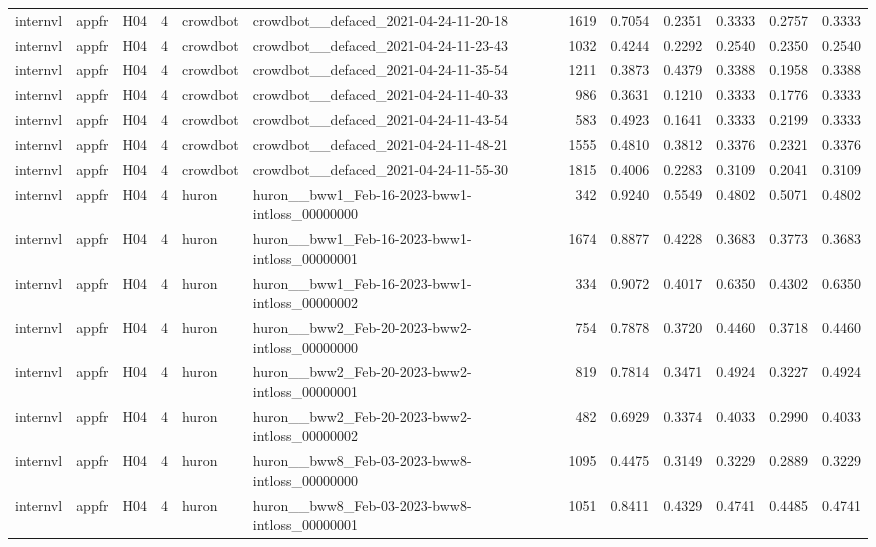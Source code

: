 \begin{table}[tbp]
\begin{tabular}{lllrllrrrrrr}
internvl & appfr & H04 & 4 & crowdbot & crowdbot\_\_defaced\_2021-04-24-11-20-18 & 1619 & 0.7054 & 0.2351 & 0.3333 & 0.2757 & 0.3333 \\
internvl & appfr & H04 & 4 & crowdbot & crowdbot\_\_defaced\_2021-04-24-11-23-43 & 1032 & 0.4244 & 0.2292 & 0.2540 & 0.2350 & 0.2540 \\
internvl & appfr & H04 & 4 & crowdbot & crowdbot\_\_defaced\_2021-04-24-11-35-54 & 1211 & 0.3873 & 0.4379 & 0.3388 & 0.1958 & 0.3388 \\
internvl & appfr & H04 & 4 & crowdbot & crowdbot\_\_defaced\_2021-04-24-11-40-33 & 986 & 0.3631 & 0.1210 & 0.3333 & 0.1776 & 0.3333 \\
internvl & appfr & H04 & 4 & crowdbot & crowdbot\_\_defaced\_2021-04-24-11-43-54 & 583 & 0.4923 & 0.1641 & 0.3333 & 0.2199 & 0.3333 \\
internvl & appfr & H04 & 4 & crowdbot & crowdbot\_\_defaced\_2021-04-24-11-48-21 & 1555 & 0.4810 & 0.3812 & 0.3376 & 0.2321 & 0.3376 \\
internvl & appfr & H04 & 4 & crowdbot & crowdbot\_\_defaced\_2021-04-24-11-55-30 & 1815 & 0.4006 & 0.2283 & 0.3109 & 0.2041 & 0.3109 \\
internvl & appfr & H04 & 4 & huron & huron\_\_bww1\_Feb-16-2023-bww1-intloss\_00000000 & 342 & 0.9240 & 0.5549 & 0.4802 & 0.5071 & 0.4802 \\
internvl & appfr & H04 & 4 & huron & huron\_\_bww1\_Feb-16-2023-bww1-intloss\_00000001 & 1674 & 0.8877 & 0.4228 & 0.3683 & 0.3773 & 0.3683 \\
internvl & appfr & H04 & 4 & huron & huron\_\_bww1\_Feb-16-2023-bww1-intloss\_00000002 & 334 & 0.9072 & 0.4017 & 0.6350 & 0.4302 & 0.6350 \\
internvl & appfr & H04 & 4 & huron & huron\_\_bww2\_Feb-20-2023-bww2-intloss\_00000000 & 754 & 0.7878 & 0.3720 & 0.4460 & 0.3718 & 0.4460 \\
internvl & appfr & H04 & 4 & huron & huron\_\_bww2\_Feb-20-2023-bww2-intloss\_00000001 & 819 & 0.7814 & 0.3471 & 0.4924 & 0.3227 & 0.4924 \\
internvl & appfr & H04 & 4 & huron & huron\_\_bww2\_Feb-20-2023-bww2-intloss\_00000002 & 482 & 0.6929 & 0.3374 & 0.4033 & 0.2990 & 0.4033 \\
internvl & appfr & H04 & 4 & huron & huron\_\_bww8\_Feb-03-2023-bww8-intloss\_00000000 & 1095 & 0.4475 & 0.3149 & 0.3229 & 0.2889 & 0.3229 \\
internvl & appfr & H04 & 4 & huron & huron\_\_bww8\_Feb-03-2023-bww8-intloss\_00000001 & 1051 & 0.8411 & 0.4329 & 0.4741 & 0.4485 & 0.4741 \\

\end{tabular}
\end{table}

